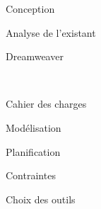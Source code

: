 \documentclass[a4paper, 12pt]{report}
\begin{document}
\begin{part}{Conception}
\begin{chapter}{Analyse de l'existant}
\begin{section}{Dreamweaver}
			\end{section}
			~\\
		\end{chapter}
		\begin{chapter}{Cahier des charges}
		\end{chapter}
		\begin{chapter}{Modélisation}
		\end{chapter}
	\end{part}
	\begin{part}{Planification}
		\begin{chapter}{Contraintes}
		\end{chapter}
		\begin{chapter}{Choix des outils}
		\end{chapter}
	\end{part}
\end{document}
